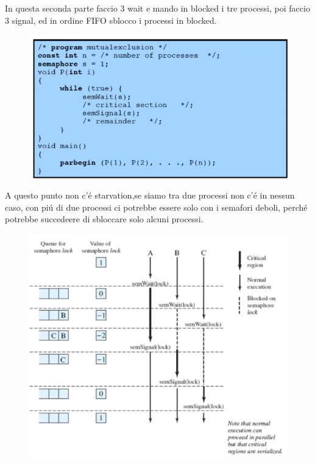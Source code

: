 In questa seconda parte faccio 3 wait e mando in blocked i tre processi, poi faccio 3 signal, ed in ordine FIFO sblocco i
processi in blocked.
\begin{figure}[H]
    \centering
    \includegraphics[width=0.7\linewidth]{immagini/MutuaEsclusioneConSemafori}
\end{figure}
A questo punto non c'é starvation,se siamo tra due processi non c'é in nessun caso, con piú di due processi
ci potrebbe essere solo con i semafori deboli, perché potrebbe succedeere di sbloccare solo alcuni processi.
\begin{figure}[H]
    \centering
    \includegraphics[width=0.7\linewidth]{immagini/EsecuzioneSemafori}
\end{figure}

